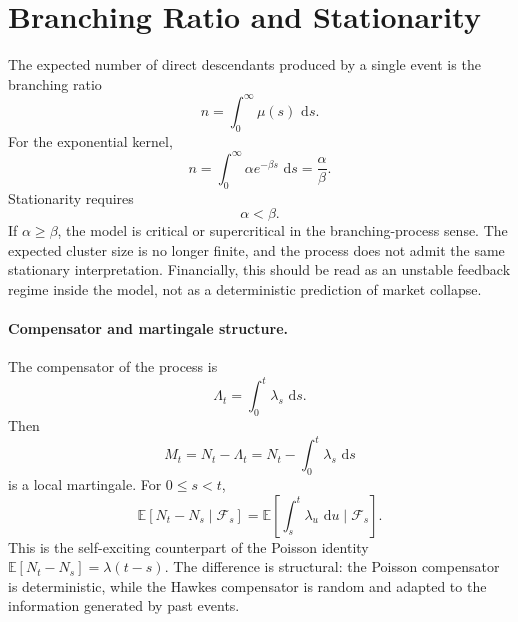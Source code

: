 \documentclass[a4paper,10pt,titlepage,oneside,openany]{book}
\theoremstyle{plain}
\theoremstyle{definition}
\theoremstyle{remark}
\newcommand{\E}{\mathbb{E}}
\newcommand{\dd}{\,\mathrm{d}}
\begin{document}
\section{Branching Ratio and Stationarity}

The expected number of direct descendants produced by a single event is the branching ratio
\begin{equation}
    n=\int_0^\infty \mu(s)\,\dd s.
    \label{eq:hawkes-branching-ratio}
\end{equation}
For the exponential kernel,
\begin{equation}
    n=\int_0^\infty \alpha e^{-\beta s}\,\dd s=\frac{\alpha}{\beta}.
    \label{eq:hawkes-exponential-ratio}
\end{equation}
Stationarity requires
\begin{equation}
    \alpha<\beta.
    \label{eq:hawkes-stationarity}
\end{equation}
If \(\alpha\geq\beta\), the model is critical or supercritical in the branching-process sense. The expected cluster size is no longer finite, and the process does not admit the same stationary interpretation. Financially, this should be read as an unstable feedback regime inside the model, not as a deterministic prediction of market collapse.

\paragraph{Compensator and martingale structure.}
The compensator of the process is
\begin{equation}
    \Lambda_t=\int_0^t\lambda_s\,\dd s.
\end{equation}
Then
\begin{equation}
    M_t=N_t-\Lambda_t
    =
    N_t-\int_0^t\lambda_s\,\dd s
\end{equation}
is a local martingale. For \(0\leq s<t\),
\begin{equation}
    \E\!\left[N_t-N_s\mid\mathcal{F}_s\right]
    =
    \E\!\left[\int_s^t\lambda_u\,\dd u\mid\mathcal{F}_s\right].
\end{equation}
This is the self-exciting counterpart of the Poisson identity \(\E[N_t-N_s]=\lambda(t-s)\). The difference is structural: the Poisson compensator is deterministic, while the Hawkes compensator is random and adapted to the information generated by past events.
\end{document}
